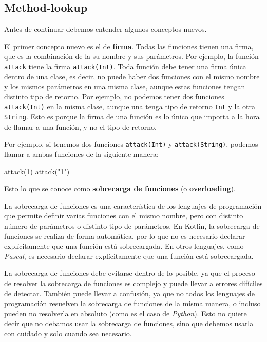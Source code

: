 \subsection{Method-lookup}
  \label{sec:method-lookup}
  Antes de continuar debemos entender algunos conceptos nuevos.

  El primer concepto nuevo es el de \textbf{firma}.
  Todas las funciones tienen una firma, que es la combinación de la su nombre y sus parámetros.
  Por ejemplo, la función \texttt{attack} tiene la firma \texttt{attack(Int)}.
  Toda función debe tener una firma única dentro de una clase, es decir, no puede haber dos 
  funciones con el mismo nombre y los mismos parámetros en una misma clase, aunque estas funciones 
  tengan distinto tipo de retorno.
  Por ejemplo, no podemos tener dos funciones \texttt{attack(Int)} en la misma clase, aunque una
  tenga tipo de retorno \texttt{Int} y la otra \texttt{String}.
  Esto es porque la firma de una función es lo único que importa a la hora de llamar a una función,
  y no el tipo de retorno.

  Por ejemplo, si tenemos dos funciones \texttt{attack(Int)} y \texttt{attack(String)}, podemos
  llamar a ambas funciones de la siguiente manera:
  
  \begin{kotlin}
    attack(1)
    attack("1")
  \end{kotlin}

  Esto lo que se conoce como \textbf{sobrecarga de funciones} (o 
  \textbf{overloading}).

  \begin{defaultbox}
    La sobrecarga de funciones es una característica de los lenguajes de programación que permite
    definir varias funciones con el mismo nombre, pero con distinto número de parámetros o distinto
    tipo de parámetros.
    En Kotlin, la sobrecarga de funciones se realiza de forma automática, por lo que no es necesario
    declarar explícitamente que una función está sobrecargada.
    En otros lenguajes, como \textit{Pascal}, es necesario declarar explícitamente que una función
    está sobrecargada.
  \end{defaultbox}

  La sobrecarga de funciones debe evitarse dentro de lo posible, ya que el proceso de resolver la
  sobrecarga de funciones es complejo\autocite{OverloadResolutionKotlin} y puede llevar a errores 
  difíciles de detectar.
  También puede llevar a confusión, ya que no todos los lenguajes de programación resuelven la
  sobrecarga de funciones de la misma manera, o incluso pueden no resolverla en absoluto (como es el
  caso de \textit{Python}).
  Esto no quiere decir que no debamos usar la sobrecarga de funciones, sino que debemos usarla con
  cuidado y solo cuando sea necesario.

